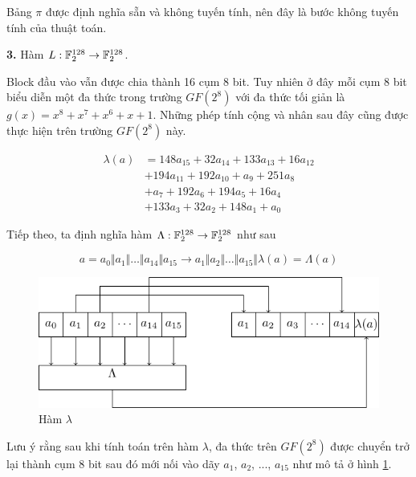 Bảng $\pi$ được định nghĩa sẵn và không tuyến tính, nên đây là bước
không tuyến tính của thuật toán.

\textbf{3.} Hàm $L: \mathbb{F}_2^{128} \to \mathbb{F}_2^{128}$.

Block đầu vào vẫn được chia thành 16 cụm 8 bit. Tuy nhiên ở
đây mỗi cụm 8 bit biểu diễn một đa thức trong trường $GF(2^8)$
với đa thức tối giản là $g(x) = x^8 + x^7 + x^6 + x + 1$.
Những phép tính cộng và nhân sau đây cũng được thực hiện trên
trường $GF(2^8)$ này.

\begin{equation}
    \label{kuz:3}
    \begin{split}
    \lambda(a) & = 148 a_{15} + 32 a_{14} + 133 a_{13} + 16 a_{12} \\
            & + 194 a_{11} + 192 a_{10} + a_9 + 251 a_8 \\
            & + a_7 + 192 a_6 + 194 a_5 + 16 a_4 \\
            & + 133 a_3 + 32 a_2 + 148 a_1 + a_0
    \end{split}
\end{equation}

Tiếp theo, ta định nghĩa hàm $\Lambda: \mathbb{F}_2^{128} \to \mathbb{F}_2^{128}$
như sau

\begin{equation*}
    a = a_0 \Vert a_1 \Vert \ldots \Vert a_{14} \Vert a_{15}
    \to a_1 \Vert a_2 \Vert \ldots \Vert a_{15} \Vert \lambda(a)
    = \Lambda(a)
\end{equation*}

\begin{figure}
    \centering
    \includegraphics{../pics/kuznyechik/funcLambda.pdf}
    \caption{Hàm $\lambda$}
    \label{kuzfic:1}
\end{figure}

Lưu ý rằng sau khi tính toán trên hàm $\lambda$, đa thức trên
$GF(2^8)$ được chuyển trở lại thành cụm 8 bit sau đó mới
nối vào dãy $a_1$, $a_2$, ..., $a_{15}$ như mô tả ở hình \ref{kuzfic:1}.

